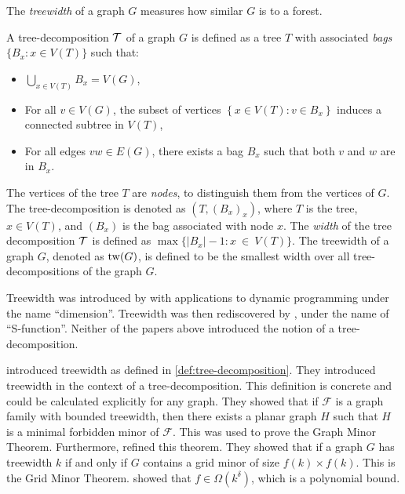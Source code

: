The \textit{treewidth} of a graph \(G\) measures how similar $G$ is to a forest.
\begin{definition}\label{def:tree-decomposition}
	A tree-decomposition \(\mathcal{T}\) of a graph \(G\) is defined as a tree \(T\) with associated \textit{bags} \(\lbrace B_x : x \in V(T) \rbrace\) such that:
	\begin{itemize}
		\item $\bigcup_{x \in V(T)} B_x = V(G)$,
		\item For all \(v \in V(G)\), the subset of vertices \(\left\lbrace x  \in V(T): v \in B_x \right\rbrace\) induces a connected subtree in \(V(T)\),
		\item For all edges \(vw \in E(G)\), there exists a bag \(B_x\) such that both \(v\) and \(w\) are in \(B_x\).
	\end{itemize}
\end{definition}
The vertices of the tree \(T\) are \textit{nodes}, to distinguish them from the vertices of $G$. 
The tree-decomposition is denoted as \((T, (B_x)_x)\), where $T$ is the tree, $x \in V(T)$, and $(B_x)$ is the bag associated with node $x$.
The \textit{width} of the tree decomposition \(\mathcal{T}\) is defined as \(\max \lbrace |B_x| - 1 : x~\in~V(T) \rbrace\).
The treewidth of a graph \(G\), denoted as \(\operatorname{tw}(G)\), is defined to be the smallest width over all tree-decompositions of the graph \(G\). 

Treewidth was introduced by \textcite{berteleChapterEliminationVariables1972} with applications to dynamic programming under the name ``dimension''. Treewidth was then rediscovered by \textcite{halinSfunctionsGraphs1976}, under the name of ``S-function''. Neither of the papers above introduced the notion of a tree-decomposition.

\textcite{robertsonGraphMinorsIII1984} introduced treewidth as defined in \cref{def:tree-decomposition}. They introduced treewidth in the context of a tree-decomposition. This definition is concrete and could be calculated explicitly for any graph. They showed that if $\mathcal{F}$ is a graph family with bounded treewidth, then there exists a planar graph $H$ such that $H$ is a minimal forbidden minor of $\mathcal{F}$. This was used to prove the Graph Minor Theorem. Furthermore, \textcite{robertsonQuicklyExcludingPlanar1994} refined this theorem. They showed that if a graph $G$ has treewidth $k$ if and only if $G$ contains a grid minor of size $f(k) \times f(k)$. This is the Grid Minor Theorem. \textcite{chekuriPolynomialBoundsGridMinor2016} showed that $f \in \Omega(k^\delta)$, which is a polynomial bound.

